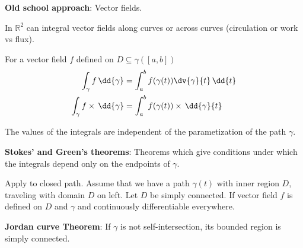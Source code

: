 \documentclass{report}
\begin{document}
\textbf{Old school approach}: Vector fields. 

In $\mathbb{R}^{2}$ can integral vector fields along curves or across curves (circulation or work vs flux).

\begin{definition}{}
    For a vector field $f$ defined on $D \subseteq \gamma([a, b])$
        \begin{align*}
            \int_{\gamma}^{} f \, \dd{\gamma}        &= \int_{a}^{b} f(\gamma(t))\dv{\gamma}{t} \, \dd{t}  \\
            \int_{\gamma}^{} f\times \, \dd{\gamma}  &= \int_{a}^{b} f(\gamma(t))\times \, \dd{\gamma}{t}   
        \end{align*}
\end{definition}

\begin{theorem}{}
    The values of the integrals are independent of the parametization of the path $\gamma$.
\end{theorem}

\textbf{Stokes' and Green's theorems}: Theorems which give conditions under which the integrals depend only on the endpoints of $\gamma$.

Apply to closed path. Assume that we have a path $\gamma(t)$ with inner region $D$, traveling with domain $D$ on left. Let $D$ be simply connected. If vector field $f$ is defined on $D$ and $\gamma$ and continuously differentiable everywhere.

\textbf{Jordan curve Theorem}: If $\gamma$ is not self-intersection, its bounded region is simply connected.
\end{document}

